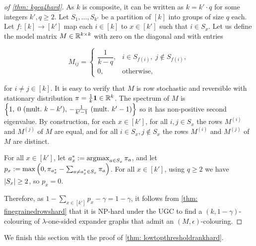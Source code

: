 \begin{proof}[of \cref{thm: kgeq4hard}]
    As $k$ is composite, it can be written as $k=k'\cdot q$ for some integers $k', q\geq 2$. Let $S_1, \ldots, S_{k'}$ be a partition of $[k]$ into groups of size $q$ each.
    Let $f: [k] \to [k']$ map each $i \in [k]$ to $x \in [k']$ such that $i \in S_x$.
    Let us define the model matrix $M \in {\mathbb R}^{k \times k}$ with zero on the diagonal and with entries
    
    \[
    M_{ij}=
    \begin{cases}
    \dfrac1{k-q}, & i\in S_{f(i)},\;j\notin S_{f(i)},\\[4pt]
    0,                                           & \text{otherwise},
    \end{cases}
    \]
    
    for $i \neq j \in [k]$. It is easy to verify that $M$ is row stochastic and reversible with stationary distribution $\pi = \frac1{k}\mathbf{1}\in {\mathbb R}^k$. The spectrum of $M$ is $\Set{1,\;0\ (\text{mult.\ }k-k'),\,-\tfrac1{k'-1}\ (\text{mult.\ }k'-1)}$ so it has non-positive second eigenvalue. By construction, for each $x \in [k']$, for all $i, j \in S_x$ the rows $M^{(i)}$ and $M^{(j)}$ of $M$ are equal, and for all $i \in S_x, j \notin S_x$ the rows $M^{(i)}$ and $M^{(j)}$ of $M$ are distinct.

    For all $x \in [k']$, let $a_x^* := \operatorname*{\arg\!\max}_{a \in S_x} \pi_a$, and let $p_x := \max\left(0, \pi_{a_x^{*}} - \sum_{\substack{a \neq a_x^{*} \in S_x}} \pi_a\right)$. For all $x\in [k']$, using $q\geq 2$ we have $\left\lvert S_x\right\rvert\geq 2$, so $p_x=0$. 

    Therefore, as $1-\sum_{x\in [k']} p_x-\gamma=1-\gamma$, it follows from \cref{thm: finegrainedrowshard} that it is NP-hard under the UGC to find a $(k, 1-\gamma)$-colouring of $\lambda$-one-sided expander graphs that admit an $(M, \epsilon)$-colouring.
\end{proof}

We finish this section with the proof of \cref{thm: lowtopthresholdrankhard}.

